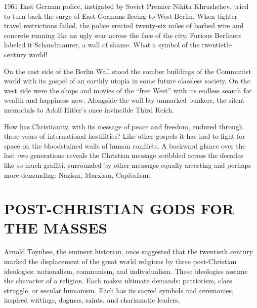 
 1961 East German police, instigated by Soviet Premier Nikita
Khrushchev, tried to turn back the surge of East Germans fleeing to West Berlin. When tighter travel
restrictions failed, the police erected twenty-six miles of barbed wire and concrete running like an
ugly scar across the face of the city. Furious Berliners labeled it Schandmaurer, a wall of shame.
What a symbol of the twentieth-century world!

On the east side of the Berlin Wall stood the somber buildings of the Communist world with its
gospel of an earthly utopia in some future classless society. On the west side were the shops and
movies of the “free West” with its endless search for wealth and happiness now. Alongside the wall
lay unmarked bunkers, the silent memorials to Adolf Hitler’s once invincible Third Reich.

How has Christianity, with its message of peace and freedom, endured through these years of
international hostilities? Like other gospels it has had to fight for space on the bloodstained
walls of human conflicts. A backward glance over the last two generations reveals the Christian
message scribbled across the decades like so much graffiti, surrounded by other messages equally
arresting and perhaps more demanding: Nazism, Marxism, Capitalism.

\section{POST-CHRISTIAN GODS FOR THE MASSES}

Arnold Toynbee, the eminent historian, once suggested that the twentieth century marked the
displacement of the great world religions by three post-Christian ideologies: nationalism,
communism, and individualism. These ideologies assume the character of a religion. Each makes
ultimate demands: patriotism, class struggle, or secular humanism. Each has its sacred symbols and
ceremonies, inspired writings, dogmas, saints, and charismatic leaders.

